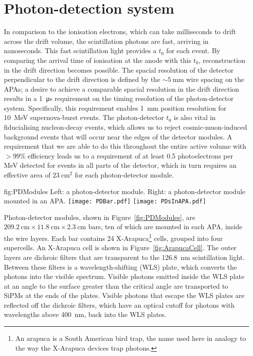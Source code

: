 
\section{Photon-detection system}
\label{sec:fdsp-exec-pds}

In comparison to the ionisation electrons, which can take milliseconds to drift across the drift volume, the scintillation photons are fast, arriving in nanoseconds. This fast scintillation light provides a $t_{0}$ for each event. By comparing the arrival time of ionisation at the anode with this $t_{0}$, reconstruction in the drift direction becomes possible. The spacial resolution of the detector perpendicular to the drift direction is defined by the $\sim\!\SI{5}{\mm}$ wire spacing on the APAs; a desire to achieve a comparable spacial resolution in the drift direction results in a \SI{1}{\micro\second} requirement on the timing resolution of the photon-detector system. Specifically, this requirement enables \SI{1}{\mm} position resolution for \SI{10}{\mega\electronvolt} supernova-burst events. The photon-detector $t_{0}$ is also vital in fiducialising nucleon-decay events, which allows us to reject cosmic-muon-induced background events that will occur near the edges of the detector modules. A requirement that we are able to do this throughout the entire active volume with $>\!99\%$ efficiency leads us to a requirement of at least 0.5 photoelectrons per MeV detected for events in all parts of the detector, which in turn requires an effective area of $\SI{23}{\cm^{2}}$ for each photon-detector module.


\begin{dunefigure}{fig:PDModules}
{Left: a photon-detector module. Right: a photon-detector module mounted in an APA.}
\texttt{[image: PDBar.pdf]}
\texttt{[image: PDsInAPA.pdf]}
\end{dunefigure}

Photon-detector modules, shown in Figure~\ref{fig:PDModules}, are $\SI{209.2}{\cm}\times\SI{11.8}{\cm}\times\SI{2.3}{\cm}$ bars, ten of which are mounted in each APA, inside the wire layers. Each bar contains 24 X-Arapuca\footnote{An arapuca is a South American bird trap, the name used here in analogy to the way the X-Arapuca devices trap photons.} cells, grouped into four supercells. An X-Arapuca cell is shown in Figure~\ref{fig:ArapucaCell}. The outer layers are dichroic filters that are transparent to the \SI{126.8}{\nano\meter} scintillation light. Between these filters is a wavelength-shifting (WLS) plate, which converts the photons into the visible spectrum.
Visible photons emitted inside the WLS plate at an angle to the surface greater than the critical angle are transported to SiPMs at the ends of the plates. Visible photons that escape the WLS plates are reflected off the dichroic filters, which have an optical cutoff for photons with wavelengths above \SI{400}{\nano\meter}, back into the WLS plates. 

